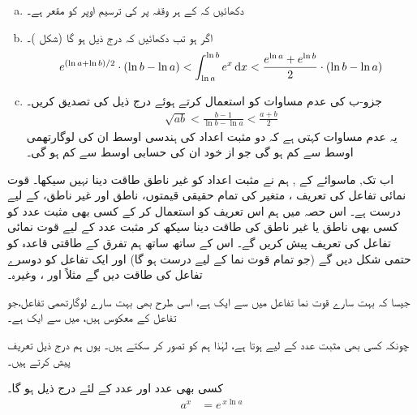 \begin{enumerate}[a.]
\item
دکھائیں کہ  کے ہر وقفہ پر  کی ترسیم اوپر  کو  مقعر  ہے۔
\item
اگر  ہو تب دکھائیں کہ درج ذیل ہو گا (شکل )۔
\begin{align*}
e^{(\ln a+\ln b)/2}\cdot(\ln b-\ln a)<\int_{\ln a}^{\ln b} e^x\dif x<\frac{e^{\ln a}+e^{\ln b}}{2}\cdot (\ln b-\ln a)
\end{align*}
\item
جزو-ب کی عدم مساوات کو استعمال کرتے ہوئے  درج ذیل کی تصدیق کریں۔
\begin{align*}
\sqrt{ab}<\frac{b-1}{\ln b-\ln a}<\frac{a+b}{2}
\end{align*}
یہ عدم مساوات کہتی ہے کہ دو مثبت اعداد کی  ہندسی اوسط ان کی لوگارتھمی اوسط سے کم ہو گی جو از خود ان کی حسابی اوسط سے کم ہو گی۔
\end{enumerate}



اب تک,  ماسوائے  کے , ہم نے مثبت اعداد کو غیر ناطق طاقت دینا نہیں سیکھا۔ قوت نمائی تفاعل کی تعریف ، متغیر   کی تمام حقیقی قیمتوں، ناطق اور غیر ناطق،  کے لیے درست ہے۔ اس حصہ میں ہم اس تعریف کو استعمال کر کے کسی بھی مثبت عدد کو کسی بھی ناطق یا غیر ناطق کی طاقت دینا سیکھ کر مثبت عدد  کے لیے قوت نمائی تفاعل  کی تعریف پیش کریں گے۔ اس کے ساتھ ساتھ ہم تفرق کے طاقتی قاعدہ کو حتمی شکل دیں گے (جو تمام قوت نما کے لیے درست ہو گا) اور ایک تفاعل کو دوسرے تفاعل کی طاقت دیں گے مثلاً  اور ، وغیرہ۔

جیسا  کہ   بہت سارے قوت نما تفاعل میں سے ایک ہے، اسی طرح  بھی بہت سارے لوگارتھمی تفاعل،جو تفاعل  کے معکوس ہیں،  میں سے ایک ہے۔

چونکہ کسی بھی مثبت عدد  کے لیے  ہوتا ہے، لہٰذا  ہم  کو  تصور کر سکتے ہیں۔ یوں ہم درج ذیل تعریف پیش کرتے ہیں۔

کسی بھی عدد  اور  عدد  کے لئے درج ذیل ہو گا۔
\begin{align}\label{مساوات_ماورائی_تعریف_طاقتی_الف}
a^x&=e^{\,x\ln a}
\end{align}

